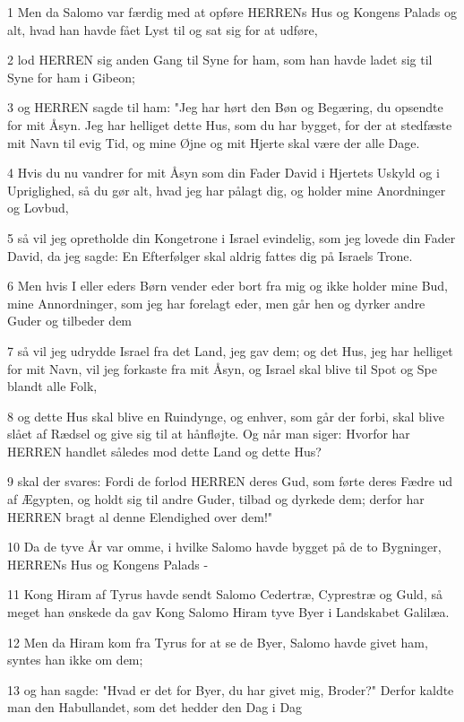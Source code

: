 \par 1 Men da Salomo var færdig med at opføre HERRENs Hus og Kongens Palads og alt, hvad han havde fået Lyst til og sat sig for at udføre,
\par 2 lod HERREN sig anden Gang til Syne for ham, som han havde ladet sig til Syne for ham i Gibeon;
\par 3 og HERREN sagde til ham: "Jeg har hørt den Bøn og Begæring, du opsendte for mit Åsyn. Jeg har helliget dette Hus, som du har bygget, for der at stedfæste mit Navn til evig Tid, og mine Øjne og mit Hjerte skal være der alle Dage.
\par 4 Hvis du nu vandrer for mit Åsyn som din Fader David i Hjertets Uskyld og i Upriglighed, så du gør alt, hvad jeg har pålagt dig, og holder mine Anordninger og Lovbud,
\par 5 så vil jeg opretholde din Kongetrone i Israel evindelig, som jeg lovede din Fader David, da jeg sagde: En Efterfølger skal aldrig fattes dig på Israels Trone.
\par 6 Men hvis I eller eders Børn vender eder bort fra mig og ikke holder mine Bud, mine Annordninger, som jeg har forelagt eder, men går hen og dyrker andre Guder og tilbeder dem
\par 7 så vil jeg udrydde Israel fra det Land, jeg gav dem; og det Hus, jeg har helliget for mit Navn, vil jeg forkaste fra mit Åsyn, og Israel skal blive til Spot og Spe blandt alle Folk,
\par 8 og dette Hus skal blive en Ruindynge, og enhver, som går der forbi, skal blive slået af Rædsel og give sig til at hånfløjte. Og når man siger: Hvorfor har HERREN handlet således mod dette Land og dette Hus?
\par 9 skal der svares: Fordi de forlod HERREN deres Gud, som førte deres Fædre ud af Ægypten, og holdt sig til andre Guder, tilbad og dyrkede dem; derfor har HERREN bragt al denne Elendighed over dem!"
\par 10 Da de tyve År var omme, i hvilke Salomo havde bygget på de to Bygninger, HERRENs Hus og Kongens Palads -
\par 11 Kong Hiram af Tyrus havde sendt Salomo Cedertræ, Cyprestræ og Guld, så meget han ønskede da gav Kong Salomo Hiram tyve Byer i Landskabet Galilæa.
\par 12 Men da Hiram kom fra Tyrus for at se de Byer, Salomo havde givet ham, syntes han ikke om dem;
\par 13 og han sagde: "Hvad er det for Byer, du har givet mig, Broder?" Derfor kaldte man den Habullandet, som det hedder den Dag i Dag
